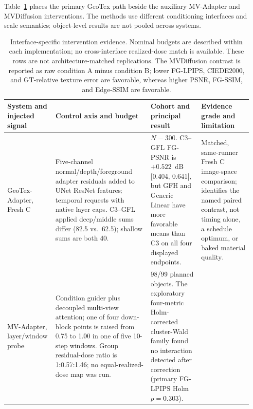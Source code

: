 \documentclass[times,twocolumn,final]{elsarticle}
\providecommand{\DIFadd}[1]{{\protect\color{blue} \sf #1}} %
\providecommand{\DIFaddbegin}{} %
\providecommand{\DIFaddend}{} %
\providecommand{\DIFaddFL}[1]{\DIFadd{#1}} %
\providecommand{\DIFaddbeginFL}{\DIFaddbegin} %
\providecommand{\DIFaddendFL}{\DIFaddend} %
\renewcommand{\DIFaddbeginFL}{}
\renewcommand{\DIFaddendFL}{}
\renewcommand{\DIFaddFL}[1]{#1}
\begin{document}
\DIFaddFL{Table~\ref{tab:cross-interface} places the primary GeoTex path beside the auxiliary MV-Adapter and MVDiffusion interventions. The methods use different conditioning interfaces and scale semantics; object-level results are not pooled across systems.
}

\begin{table}[t]
\centering
\scriptsize
\setlength{\tabcolsep}{3pt}
\caption{Interface-specific intervention evidence. Nominal budgets are described within each implementation; no cross-interface realized-dose match is available. These rows are not architecture-matched replications. The MVDiffusion contrast is reported as raw condition A minus condition B; lower FG-LPIPS, CIEDE2000, and GT-relative texture error are favorable, whereas higher PSNR, FG-SSIM, and Edge-SSIM are favorable.}
\label{tab:cross-interface}
\begin{tabular}{p{2.4cm}p{4.0cm}p{4.2cm}p{4.5cm}}
\DIFaddendFL \toprule
  \DIFaddbeginFL \DIFaddFL{System and injected signal }\DIFaddendFL &   \DIFaddbeginFL \DIFaddFL{Control axis and budget }\DIFaddendFL &   \DIFaddbeginFL \DIFaddFL{Cohort and principal result }\DIFaddendFL &   \DIFaddbeginFL \DIFaddFL{Evidence grade and limitation }\DIFaddendFL \\
\midrule
  \DIFaddbeginFL \DIFaddFL{GeoTex-Adapter, Fresh C }\DIFaddendFL &
  \DIFaddbeginFL \DIFaddFL{Five-channel normal/depth/foreground adapter residuals added to UNet ResNet features; temporal requests with native layer caps. C3--GFL applied deep/middle sums differ (82.5 vs.\ 62.5); shallow sums are both 40. }\DIFaddendFL &
  \DIFaddbeginFL \DIFaddFL{$N=300$. C3--GFL FG-PSNR is $+0.522$~dB }[\DIFaddFL{0.404, 0.641}]\DIFaddFL{, but GFH and Generic Linear have more favorable means than C3 on all four displayed endpoints. }\DIFaddendFL &
  \DIFaddbeginFL \DIFaddFL{Matched, same-runner Fresh C image-space comparison; identifies the named paired contrast, not timing alone, a schedule optimum, or baked material quality. }\DIFaddendFL \\
  \DIFaddbeginFL \DIFaddFL{MV-Adapter, layer/window probe }\DIFaddendFL &
  \DIFaddbeginFL \DIFaddFL{Condition guider plus decoupled multi-view attention; one of four down-block points is raised from 0.75 to 1.00 in one of five 10-step windows. Group residual-dose ratio is 1:0.57:1.46; no equal-realized-dose map was run. }\DIFaddendFL &
  \DIFaddbeginFL \DIFaddFL{98/99 planned objects. The exploratory four-metric Holm-corrected cluster-Wald family found no interaction detected after correction (primary FG-LPIPS Holm $p=0.303$). }\DIFaddendFL &

\end{tabular}
\end{table}
\end{document}
